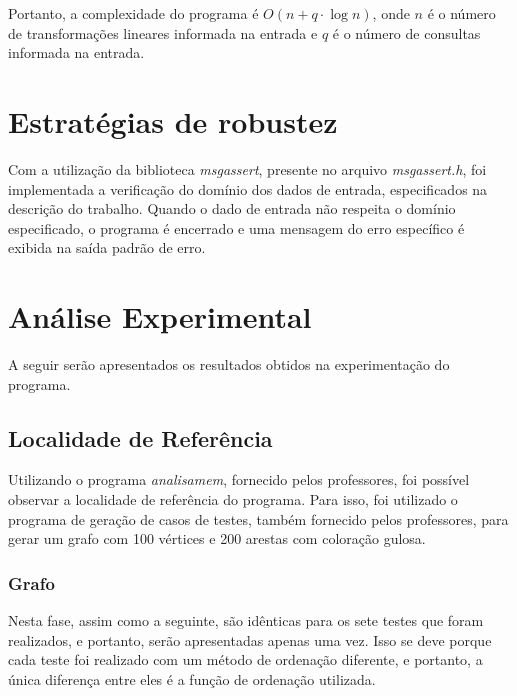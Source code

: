 \documentclass{article}
\begin{document}
Portanto, a complexidade do programa é $O(n + q \cdot \log n)$, onde $n$ é o número de transformações lineares informada na entrada e $q$ é o número de consultas informada na entrada.

\section{Estratégias de robustez}
Com a utilização da biblioteca \emph{msgassert}, presente no arquivo \emph{msgassert.h}, foi implementada a verificação do domínio dos dados de entrada, especificados na descrição do trabalho. 
Quando o dado de entrada não respeita o domínio especificado, o programa é encerrado e uma mensagem do erro específico é exibida na saída padrão de erro.

\section{Análise Experimental}

A seguir serão apresentados os resultados obtidos na experimentação do programa.

\subsection{Localidade de Referência}

Utilizando o programa \emph{analisamem}, fornecido pelos professores, foi possível observar a localidade de referência do programa. 
Para isso, foi utilizado o programa de geração de casos de testes, também fornecido pelos professores, para gerar um grafo com 100 vértices e 200 arestas com coloração gulosa.

\subsubsection{Grafo }
Nesta fase, assim como a seguinte, são idênticas para os sete testes que foram realizados, e portanto, serão apresentadas apenas uma vez. Isso se deve porque cada teste foi realizado com um método de ordenação diferente, e portanto, a única diferença entre eles é a função de ordenação utilizada.


\end{document}
